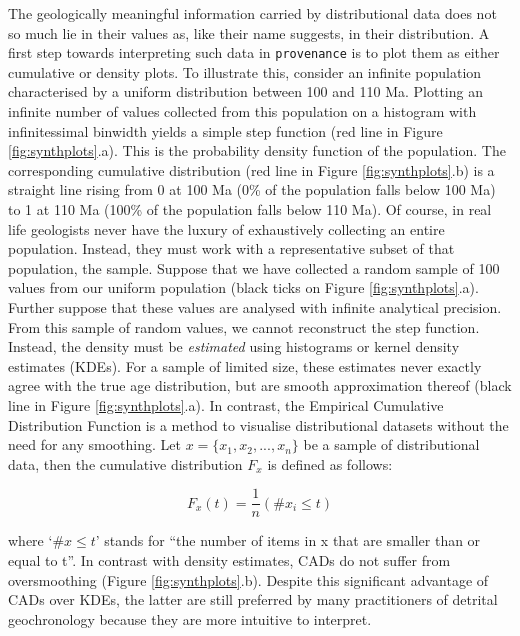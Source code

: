 \documentclass{article}
\begin{document}
The geologically meaningful information carried by distributional data
does not so much lie in their values as, like their name suggests, in
their distribution. A first step towards interpreting such data in
{\tt provenance} is to plot them as either cumulative or density
plots. To illustrate this, consider an infinite population
characterised by a uniform distribution between 100 and 110
Ma. Plotting an infinite number of values collected from this
population on a histogram with infinitessimal binwidth yields a simple
step function (red line in Figure \ref{fig:synthplots}.a). This is the
probability density function of the population. The corresponding
cumulative distribution (red line in Figure \ref{fig:synthplots}.b) is
a straight line rising from 0 at 100 Ma (0\% of the population falls
below 100 Ma) to 1 at 110 Ma (100\% of the population falls below 110
Ma). Of course, in real life geologists never have the luxury of
exhaustively collecting an entire population. Instead, they must work
with a representative subset of that population, the sample. Suppose
that we have collected a random sample of 100 values from our uniform
population (black ticks on Figure \ref{fig:synthplots}.a). Further
suppose that these values are analysed with infinite analytical
precision. From this sample of random values, we cannot reconstruct
the step function. Instead, the density must be {\it estimated} using
histograms or kernel density estimates (KDEs). For a sample of limited
size, these estimates never exactly agree with the true age
distribution, but are smooth approximation thereof (black line in
Figure \ref{fig:synthplots}.a).  In contrast, the Empirical Cumulative
Distribution Function \citep[ECDF, a.k.a. `Cumulative Age
  Distribution' or CAD in a geochronological
  context,][]{vermeesch2007a} is a method to visualise distributional
datasets without the need for any smoothing. Let $x =
\{x_1,x_2,...,x_n\}$ be a sample of distributional data, then the
cumulative distribution $F_x$ is defined as follows:

\begin{equation}
F_x(t) = \frac{1}{n}(\#x_i \leq t)
\label{eq:cdf}
\end{equation}

where `$\#x \leq t$' stands for ``the number of items in x that are
smaller than or equal to t''. In contrast with density estimates, CADs
do not suffer from oversmoothing (Figure
\ref{fig:synthplots}.b). Despite this significant advantage of CADs
over KDEs, the latter are still preferred by many practitioners of
detrital geochronology because they are more intuitive to interpret.\\
\end{document}

